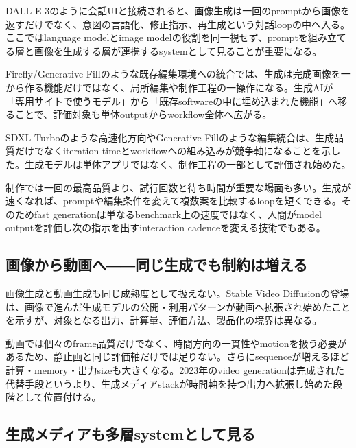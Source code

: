 DALL-E 3のように会話UIと接続されると、画像生成は一回のpromptから画像を返すだけでなく、意図の言語化、修正指示、再生成という対話loopの中へ入る。ここではlanguage modelとimage modelの役割を同一視せず、promptを組み立てる層と画像を生成する層が連携するsystemとして見ることが重要になる。\autocite{src-9bc8e7751f80,src-ba80e5e27a11}


Firefly/Generative Fillのような既存編集環境への統合では、生成は完成画像を一から作る機能だけではなく、局所編集や制作工程の一操作になる。生成AIが「専用サイトで使うモデル」から「既存softwareの中に埋め込まれた機能」へ移ることで、評価対象も単体outputからworkflow全体へ広がる。\autocite{src-2b694ab9a461,src-a4f61fbe35c5}


SDXL Turboのような高速化方向やGenerative Fillのような編集統合は、生成品質だけでなくiteration timeとworkflowへの組み込みが競争軸になることを示した。生成モデルは単体アプリではなく、制作工程の一部として評価され始めた。\autocite{src-091bbe9dbf4e,src-18f22707bf78,src-2b694ab9a461,src-317afaba6510,src-9da0d929aa45,src-a4f61fbe35c5,src-e79065444906}


制作では一回の最高品質より、試行回数と待ち時間が重要な場面も多い。生成が速くなれば、promptや編集条件を変えて複数案を比較するloopを短くできる。そのためfast generationは単なるbenchmark上の速度ではなく、人間がmodel outputを評価し次の指示を出すinteraction cadenceを変える技術でもある。\autocite{src-091bbe9dbf4e,src-18f22707bf78,src-317afaba6510,src-9da0d929aa45,src-e79065444906}


\subsection{画像から動画へ――同じ生成でも制約は増える}

画像生成と動画生成も同じ成熟度として扱えない。Stable Video Diffusionの登場は、画像で進んだ生成モデルの公開・利用パターンが動画へ拡張され始めたことを示すが、対象となる出力、計算量、評価方法、製品化の境界は異なる。\autocite{src-091bbe9dbf4e,src-096341c0ccf6,src-0b410c70bfc7,src-18f22707bf78,src-2c97fc5583a3,src-317afaba6510,src-9da0d929aa45,src-e79065444906}


動画では個々のframe品質だけでなく、時間方向の一貫性やmotionを扱う必要があるため、静止画と同じ評価軸だけでは足りない。さらにsequenceが増えるほど計算・memory・出力sizeも大きくなる。2023年のvideo generationは完成された代替手段というより、生成メディアstackが時間軸を持つ出力へ拡張し始めた段階として位置付ける。\autocite{src-096341c0ccf6,src-0b410c70bfc7,src-2c97fc5583a3}


\subsection{生成メディアも多層systemとして見る}

